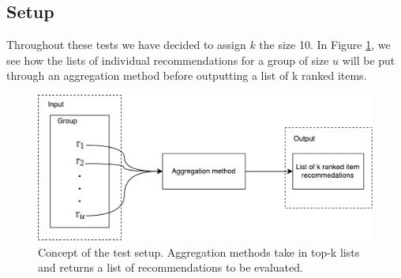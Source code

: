 \subsection{Setup}\label{sec:setup}
Throughout these tests we have decided to assign $k$ the size 10. In Figure \ref{fig:setup}, we see how the lists of individual recommendations for a group of size $u$ will be put through an aggregation method before outputting a list of k ranked items.
\begin{figure}[h]
	\centering
	\includegraphics[scale=.4]{graphics/setup}
	\caption{Concept of the test setup. Aggregation methods take in top-k lists and returns a list of recommendations to be evaluated.}
	\label{fig:setup}
\end{figure}





